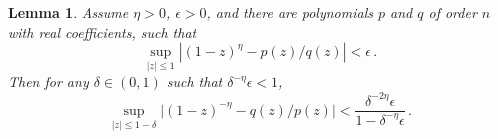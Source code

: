\documentclass[12pt]{article} %
\newcommand{\abs}[1]{\left| #1 \right|}
\newtheorem{lemma}[theorem]{Lemma}
\begin{document}

\begin{lemma} \label{lem:inversion-trick}   Assume $\eta > 0$, $\epsilon > 0$, and there are  polynomials $p$ and $q$ of order $n$ with real coefficients, such that 
%
$$ \sup_{|z| \leq 1} \left|(1 - z)^{\eta} - p(z) / q(z) \right| < \epsilon \, .$$
%
Then for  any $\delta \in( 0,1)$ such that $\delta^{-\eta} \epsilon < 1$,
%
$$\sup_{|z| \leq 1 - \delta} \big| (1 - z)^{-\eta} - q(z) / p(z) \big| < \frac{\delta^{-2 \eta}\epsilon}{1 - \delta^{-\eta} \epsilon} \, .$$
\end{lemma}
\end{document}
